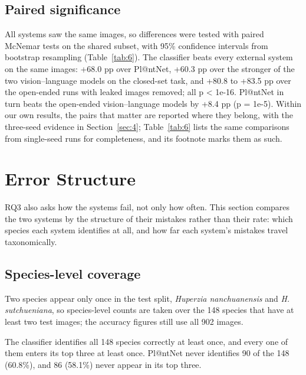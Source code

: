 \documentclass[preprint,12pt,authoryear]{elsarticle}
\begin{document}
\setcounter{section}{7}

\setcounter{subsection}{4}

\subsection{Paired significance}\label{sec:7.5}

All systems saw the same images, so differences were tested with paired McNemar tests on the shared subset, with 95\% confidence intervals from bootstrap resampling (Table~\ref{tab:6}). The classifier beats every external system on the same images: +68.0 pp over Pl@ntNet, +60.3 pp over the stronger of the two vision--language models on the closed-set task, and +80.8 to +83.5 pp over the open-ended runs with leaked images removed; all p \textless{} 1e-16. Pl@ntNet in turn beats the open-ended vision--language models by +8.4 pp (p = 1e-5). Within our own results, the pairs that matter are reported where they belong, with the three-seed evidence in Section~\ref{sec:4}; Table~\ref{tab:6} lists the same comparisons from single-seed runs for completeness, and its footnote marks them as such.

\setcounter{section}{7}

\section{Error Structure}\label{sec:8}

RQ3 also asks how the systems fail, not only how often. This section compares the two systems by the structure of their mistakes rather than their rate: which species each system identifies at all, and how far each system's mistakes travel taxonomically.

\setcounter{section}{8}

\setcounter{subsection}{0}

\subsection{Species-level coverage}\label{sec:8.1}

Two species appear only once in the test split, \emph{Huperzia nanchuanensis} and \emph{H. sutchueniana}, so species-level counts are taken over the 148 species that have at least two test images; the accuracy figures still use all 902 images.

The classifier identifies all 148 species correctly at least once, and every one of them enters its top three at least once. Pl@ntNet never identifies 90 of the 148 (60.8\%), and 86 (58.1\%) never appear in its top three.
\end{document}
